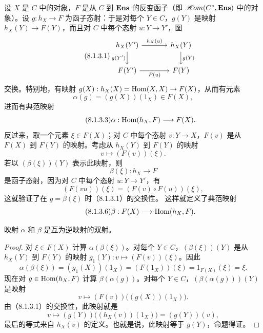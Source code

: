 设 $X$ 是 $C$ 中的对象，$F$ 是从 $C$ 到 $\mathbf{Ens}$ 的反变函子（即 $\mathscr{H}\!om(C^\circ,\mathbf{Ens})$ 中的对象）。设 $g:h_X\to F$ 为函子态射：于是对每个 $Y\in C$，$g(Y)$ 是映射 $h_X(Y)\to F(Y)$，而且对 $C$ 中每个态射 $u:Y\to Y'$，图
\begin{equation}\tag{8.1.3.1}
\begin{tikzcd}[column sep=large]
h_X(Y')\arrow[r,"h_X(u)"]\arrow[d,"g(Y')"']&h_X(Y)\arrow[d,"g(Y)"]\\
F(Y')\arrow[r,"F(u)"']&F(Y)
\end{tikzcd}
\end{equation}
交换。特别地，有映射 $g(X):h_X(X)=\operatorname{Hom}(X,X)\to F(X)$，从而有元素
\begin{equation}\tag{8.1.3.2}
\alpha(g)=(g(X))(1_X)\in F(X),
\end{equation}
进而有典范映射
\begin{equation}\tag{8.1.3.3}
\alpha:\operatorname{Hom}(h_X,F)\longrightarrow F(X).
\end{equation}
反过来，取一个元素 $\xi\in F(X)$；对 $C$ 中每个态射 $v:Y\to X$，$F(v)$ 是从 $F(X)$ 到 $F(Y)$ 的映射。考虑从 $h_X(Y)$ 到 $F(Y)$ 的映射
\begin{equation}\tag{8.1.3.4}
v\longmapsto(F(v))(\xi).
\end{equation}
若以 $(\beta(\xi))(Y)$ 表示此映射，则
\begin{equation}\tag{8.1.3.5}
\beta(\xi):h_X\longrightarrow F
\end{equation}
是函子态射，因为对 $C$ 中每个态射 $u:Y\to Y'$，有
\[
(F(vu))(\xi)=(F(v)\circ F(u))(\xi),
\]
这就验证了在 $g=\beta(\xi)$ 时（8.1.3.1）的交换性。
这样就定义了典范映射
\begin{equation}\tag{8.1.3.6}
\beta:F(X)\longrightarrow\operatorname{Hom}(h_X,F).
\end{equation}

映射 $\alpha$ 和 $\beta$ 是互为逆映射的双射。
\begin{proof}
对 $\xi\in F(X)$ 计算 $\alpha(\beta(\xi))$。对每个 $Y\in C$，$(\beta(\xi))(Y)$ 是从 $h_X(Y)$ 到 $F(Y)$ 的映射 $g_1(Y):v\mapsto(F(v))(\xi)$。因此
\[
\alpha(\beta(\xi))=(g_1(X))(1_X)=(F(1_X))(\xi)=1_{F(X)}(\xi)=\xi.
\]
现在对 $g\in\operatorname{Hom}(h_X,F)$ 计算 $\beta(\alpha(g))$。对每个 $Y\in C$，$(\beta(\alpha(g)))(Y)$ 是映射
\[
v\longmapsto(F(v))\bigl((g(X))(1_X)\bigr).
\]
由（8.1.3.1）的交换性，此映射就是
\[
v\longmapsto(g(Y))\bigl((h_X(v))(1_X)\bigr)=(g(Y))(v),
\]
最后的等式来自 $h_X(v)$ 的定义。也就是说，此映射等于 $g(Y)$，命题得证。
\end{proof}

